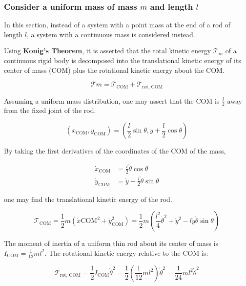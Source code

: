 \subsubsection{Consider a uniform mass of mass $m$ and length $l$}
In this section, instead of a system with a point mass at the end of a rod of length $l$, a system with a continuous mass is considered instead.

Using \textbf{Konig's Theorem}, it is asserted that the total kinetic energy $\mathcal{T}_m$ of a continuous rigid body is decomposed into the translational kinetic energy of its center of mass (COM) plus the rotational kinetic energy about the COM.

\begin{equation}
    \mathcal{T}m = \mathcal{T}_\text{COM} + \mathcal{T}_\text{rot, COM}
\end{equation}

Assuming a uniform mass distribution, one may assert that the COM is $\frac{l}{2}$ away from the fixed joint of the rod.

\begin{equation}
    (x_\text{COM}, y_\text{COM}) = \left( \frac{l}{2}\sin\theta, y + \frac{l}{2}\cos\theta \right)
\end{equation}

By taking the first derivatives of the coordinates of the COM of the mass,

\begin{align}
    \dot{x}_{\text{COM}} &= \frac{l}{2}\dot{\theta}\cos\theta \\
    \dot{y}_{\text{COM}} &= \dot{y} - \frac{l}{2}\dot{\theta}\sin\theta
\end{align}

one may find the translational kinetic energy of the rod.

\begin{equation}
    \mathcal{T}_{\text{COM}} = 
        \frac{1}{2}m \left( \dot{x}{\text{COM}}^2 + \dot{y}_{\text{COM}}^2 \right) =
        \frac{1}{2}m \left( \frac{l^2}{4}\dot{\theta}^2 + \dot{y}^2 - l\dot{y}\dot{\theta}\sin\theta \right)
\end{equation}

The moment of inertia of a uniform thin rod about its center of mass is $I_\text{COM} = \frac{1}{12}ml^2$. The rotational kinetic energy relative to the COM is:

\begin{equation}
    \mathcal{T}_{\text{rot, COM}} =
    \frac{1}{2}I_{\text{COM}}\dot{\theta}^2 =
    \frac{1}{2}\left(\frac{1}{12}ml^2\right)\dot{\theta}^2 =
    \frac{1}{24}ml^2\dot{\theta}^2
\end{equation}

